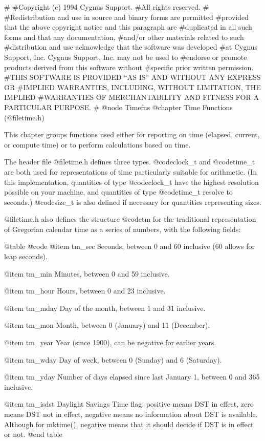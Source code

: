 #
#Copyright (c) 1994 Cygnus Support.
#All rights reserved.
#
#Redistribution and use in source and binary forms are permitted
#provided that the above copyright notice and this paragraph are
#duplicated in all such forms and that any documentation,
#and/or other materials related to such
#distribution and use acknowledge that the software was developed
#at Cygnus Support, Inc.  Cygnus Support, Inc. may not be used to
#endorse or promote products derived from this software without
#specific prior written permission.
#THIS SOFTWARE IS PROVIDED ``AS IS'' AND WITHOUT ANY EXPRESS OR
#IMPLIED WARRANTIES, INCLUDING, WITHOUT LIMITATION, THE IMPLIED
#WARRANTIES OF MERCHANTABILITY AND FITNESS FOR A PARTICULAR PURPOSE.
#
@node Timefns
@chapter Time Functions (@file{time.h})

This chapter groups functions used either for reporting on time
(elapsed, current, or compute time) or to perform calculations based
on time.

The header file @file{time.h} defines three types.  @code{clock_t} and
@code{time_t} are both used for representations of time particularly
suitable for arithmetic.  (In this implementation, quantities of type
@code{clock_t} have the highest resolution possible on your machine,
and quantities of type @code{time_t} resolve to seconds.)  @code{size_t}
is also defined if necessary for quantities representing sizes.

@file{time.h} also defines the structure @code{tm} for the traditional
representation of Gregorian calendar time as a series of numbers, with
the following fields:

@table @code
@item tm_sec
Seconds, between 0 and 60 inclusive (60 allows for leap seconds).

@item tm_min
Minutes, between 0 and 59 inclusive.

@item tm_hour
Hours, between 0 and 23 inclusive.

@item tm_mday
Day of the month, between 1 and 31 inclusive.

@item tm_mon
Month, between 0 (January) and 11 (December).

@item tm_year
Year (since 1900), can be negative for earlier years.

@item tm_wday
Day of week, between 0 (Sunday) and 6 (Saturday).

@item tm_yday
Number of days elapsed since last January 1, between 0 and 365 inclusive.

@item tm_isdst
Daylight Savings Time flag: positive means DST in effect, zero means DST
not in effect, negative means no information about DST is available.
Although for mktime(), negative means that it should decide if DST is in
effect or not.
@end table

